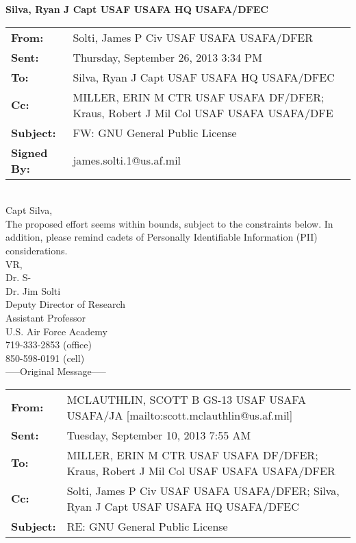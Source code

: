 \documentclass{article}
\begin{document}
\noindent\textbf{\large{Silva, Ryan J Capt USAF USAFA HQ USAFA/DFEC}}

\noindent\makebox[\linewidth]{\rule[5mm]{\linewidth}{3.5pt}}

\noindent \begin{tabu} to \textwidth{l X[l]}

    \textbf{From:} & Solti, James P Civ USAF USAFA USAFA/DFER\\ 
    \textbf{Sent:} & Thursday, September 26, 2013 3:34 PM \\
    \textbf{To:} &  Silva, Ryan J Capt USAF USAFA HQ USAFA/DFEC \\
    \textbf{Cc:} & MILLER, ERIN M CTR USAF USAFA DF/DFER; Kraus, Robert J Mil Col USAF USAFA USAFA/DFE \\
    \textbf{Subject:} & FW: GNU General Public License \\
    \textbf{Signed By:} & james.solti.1@us.af.mil \\
\end{tabu}
\hspace{0pt} \\

Capt Silva, \\

The proposed effort seems within bounds, subject to the constraints below.
In addition, please remind cadets of Personally Identifiable Information
(PII) considerations. \\

VR, \\

Dr. S- \\

\noindent Dr. Jim Solti \\
Deputy Director of Research \\
Assistant Professor \\
U.S. Air Force Academy \\
719-333-2853 (office) \\
850-598-0191 (cell) \\


\noindent-----Original Message----- \\

\noindent \begin{tabu} to \textwidth{l X[l]}

    \textbf{From:} & MCLAUTHLIN, SCOTT B GS-13 USAF USAFA USAFA/JA [mailto:scott.mclauthlin@us.af.mil]\\ 
    \textbf{Sent:} & Tuesday, September 10, 2013 7:55 AM \\
    \textbf{To:} & MILLER, ERIN M CTR USAF USAFA DF/DFER; Kraus, Robert J Mil Col USAF USAFA USAFA/DFER \\
    \textbf{Cc:} & Solti, James P Civ USAF USAFA USAFA/DFER; Silva, Ryan J Capt USAF USAFA HQ USAFA/DFEC \\
    \textbf{Subject:} & RE: GNU General Public License \\
\end{tabu}
\hspace{0pt} \\
\end{document}
